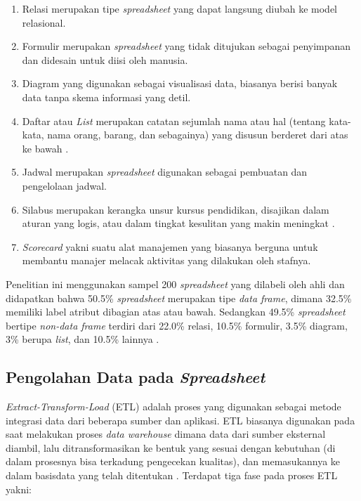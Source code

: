 \begin{enumerate}
    \item Relasi merupakan tipe \textit{spreadsheet} yang dapat langsung diubah ke model relasional.
    \item Formulir merupakan \textit{spreadsheet} yang tidak ditujukan sebagai penyimpanan dan didesain untuk diisi oleh manusia.
    \item Diagram yang digunakan sebagai visualisasi data, biasanya berisi banyak data tanpa skema informasi yang detil.
    \item Daftar atau \textit{List} merupakan catatan sejumlah nama atau hal (tentang kata-kata, nama orang, barang, dan sebagainya) yang disusun berderet dari atas ke bawah \citep{pusat1991kamus}.
    \item Jadwal merupakan \textit{spreadsheet} digunakan sebagai pembuatan dan pengelolaan jadwal.
    \item Silabus merupakan kerangka unsur kursus pendidikan, disajikan dalam aturan yang logis, atau dalam tingkat kesulitan yang makin meningkat \citep{pusat1991kamus}.
    \item \textit{Scorecard} yakni suatu alat manajemen yang biasanya berguna untuk membantu manajer melacak aktivitas yang dilakukan oleh stafnya.
\end{enumerate}

Penelitian ini menggunakan sampel 200 \textit{spreadsheet} yang dilabeli oleh ahli dan didapatkan bahwa 50.5\% \textit{spreadsheet} merupakan tipe \textit{data frame}, dimana 32.5\% memiliki label atribut dibagian atas atau bawah. Sedangkan 49.5\% \textit{spreadsheet} bertipe \textit{non-data frame} terdiri dari 22.0\% relasi, 10.5\% formulir, 3.5\% diagram, 3\% berupa \textit{list}, dan 10.5\% lainnya \citep{Chen2013}.

\subsection{Pengolahan Data pada \textit{Spreadsheet}}
\textit{Extract-Transform-Load} (ETL) adalah proses yang digunakan sebagai metode integrasi data dari beberapa sumber dan aplikasi. ETL biasanya digunakan pada saat melakukan proses \textit{data warehouse} dimana data dari sumber eksternal diambil, lalu ditransformasikan ke bentuk yang sesuai dengan kebutuhan (di dalam prosesnya bisa terkadung pengecekan kualitas), dan memasukannya ke dalam basisdata yang telah ditentukan \citep{Bansal2014}. Terdapat tiga fase pada proses ETL yakni:

